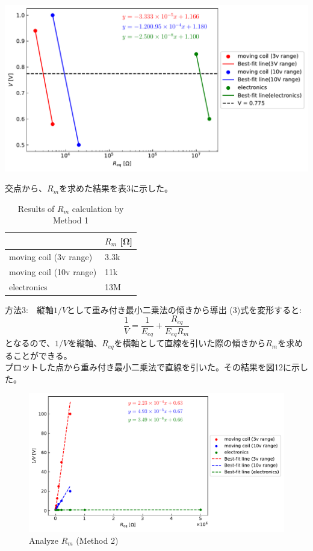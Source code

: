 \documentclass[a4paper,10pt]{jsarticle}
\makeatletter
\newenvironment{figurehere}
{\def\@captype{figure}}
{}
\makeatother
\begin{document}
\begin{figurehere}
  \centering
  \hspace*{2cm}
  \includegraphics[width=0.7\linewidth]{figs/req_vs_1_V_with_fit_lines.pdf}
  \caption{Analyze $R_m$ (Method 2)}
  \label{fig:my_label}
\end{figurehere}
交点から、$R_{m}$を求めた結果を表3に示した。
\begin{table}[H]
  \centering
  \caption{Results of $R_m$ calculation by Method 1}
    \begin{tabular}{ll}
          & \multicolumn{1}{l}{$R_m$ [Ω]} \\
    \midrule
    \midrule
    moving coil (3v range) & 3.3k \\
    moving coil (10v range) & 11k \\
    electronics & 13M \\
    \end{tabular}%
  \label{tab:addlabel}%
\end{table}%
方法3:　縦軸$1/V$として重み付き最小二乗法の傾きから導出
(3)式を変形すると:
\begin{equation}
  \frac{1}{V} = \frac{1}{E_{eq}} + \frac{R_{eq}}{E_{eq}R_m}
\end{equation}
となるので、$1/V$を縦軸、$R_{eq}$を横軸として直線を引いた際の傾きから$R_m$を求めることができる。\\
プロットした点から重み付き最小二乗法で直線を引いた。その結果を図12に示した。\\

\begin{figure}[H]
  \hspace*{2cm}
  \centering
  \includegraphics[width=0.7\linewidth]{figs/req_vs_V_with_fit_lines.pdf}
  \caption{Analyze $R_m$ (Method 2)}
  \label{fig:my_label}
\end{figure}
\end{document}
